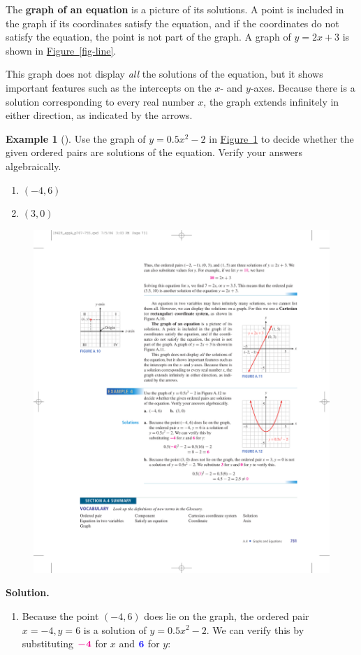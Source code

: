 \documentclass[10pt,]{book}
\newcommand{\terminology}[1]{\textbf{#1}}
\theoremstyle{plain}
\theoremstyle{definition}
\theoremstyle{definition}
\newtheorem{example}[theorem]{Example}
\theoremstyle{definition}
\numberwithin{equation}{part}
\newcommand{\alert}[1]{\boldsymbol{\color{magenta}{#1}}}
\newcommand{\blert}[1]{\boldsymbol{\color{blue}{#1}}}
\begin{document}
\par
The \terminology{graph of an equation} is a picture of its solutions. A point is included in the graph if its coordinates satisfy the equation, and if the coordinates do not satisfy the equation, the point is not part of the graph. A graph of \(y = 2x + 3\) is shown in \hyperref[fig-line]{Figure~\ref{fig-line}}.%
\par
This graph does not display \emph{all} the solutions of the equation, but it shows important features such as the intercepts on the \(x\)- and \(y\)-axes. Because there is a solution corresponding to every real number \(x\), the graph extends infinitely in either direction, as indicated by the arrows.%
\begin{example}[]\label{example-29}
Use the graph of \(y = 0.5x^2 − 2\) in \hyperref[fig-parabola0]{Figure~\ref{fig-parabola0}} to decide whether the given ordered pairs are solutions of the equation. Verify your answers algebraically. \leavevmode%
\begin{enumerate}[label=*\alph**]
\item\hypertarget{li-169}{}\((−4, 6)\)%
\item\hypertarget{li-170}{}\((3, 0)\)%
\end{enumerate}
 \leavevmode%
\begin{figure}
\centering
\includegraphics[width=0.45\linewidth]{images/fig-parabola0}
\caption{\label{fig-parabola0}}
\end{figure}
%
\par\medskip\noindent%
\textbf{Solution.}\quad \leavevmode%
\begin{enumerate}[label=*\alph**]
\item\hypertarget{li-171}{}Because the point \((−4, 6)\) does lie on the graph, the ordered pair \(x=−4, y = 6\) is a solution of \(y = 0.5x^2 − 2\). We can verify this by substituting \(\alert{-4}\) for \(x\) and \(\blert{6}\) for \(y\):%

\end{enumerate}
\end{example}
\end{document}
